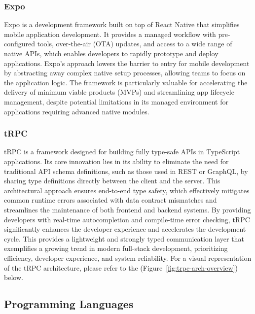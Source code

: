 \subsubsection{Expo}
Expo is a development framework built on top of React Native that simplifies mobile application development. It provides a managed workflow with pre-configured tools, over-the-air (OTA) updates, and access to a wide range of native APIs, which enables developers to rapidly prototype and deploy applications. Expo’s approach lowers the barrier to entry for mobile development by abstracting away complex native setup processes, allowing teams to focus on the application logic. The framework is particularly valuable for accelerating the delivery of minimum viable products (MVPs) and streamlining app lifecycle management, despite potential limitations in its managed environment for applications requiring advanced native modules. \cite{expo2024coreconcepts}

\subsubsection{tRPC}
tRPC is a framework designed for building fully type-safe APIs in TypeScript applications\cite{trpc2025quickstart}. Its core innovation lies in its ability to eliminate the need for traditional API schema definitions, such as those used in REST or GraphQL, by sharing type definitions directly between the client and the server. This architectural approach ensures end-to-end type safety, which effectively mitigates common runtime errors associated with data contract mismatches and streamlines the maintenance of both frontend and backend systems. By providing developers with real-time autocompletion and compile-time error checking, tRPC significantly enhances the developer experience and accelerates the development cycle. This provides a lightweight and strongly typed communication layer that exemplifies a growing trend in modern full-stack development, prioritizing efficiency, developer experience, and system reliability. For a visual representation of the tRPC architecture, please refer to the (Figure~\ref{fig:trpc-arch-overview}) below.


\subsection{Programming Languages}
